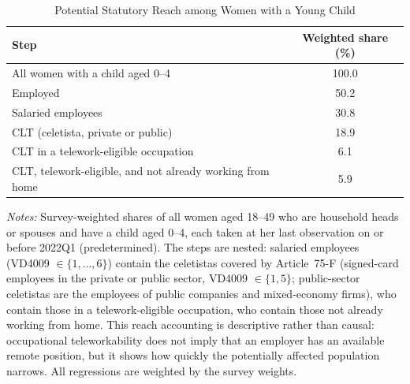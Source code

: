 \begin{table}[H]\centering
\caption{Potential Statutory Reach among Women with a Young Child}
\label{tab:reach}\small
\begin{tabular}{lc}
\toprule
Step & Weighted share (\%) \\
\midrule
All women with a child aged 0--4 & 100.0 \\
Employed & 50.2 \\
Salaried employees & 30.8 \\
CLT (celetista, private or public) & 18.9 \\
CLT in a telework-eligible occupation & 6.1 \\
CLT, telework-eligible, and not already working from home & 5.9 \\
\bottomrule\end{tabular}
\par\vspace{3pt}\footnotesize\raggedright \textit{Notes:} Survey-weighted shares of all women aged 18--49 who are household heads or spouses and have a child aged 0--4, each taken at her last observation on or before 2022Q1 (predetermined). The steps are nested: salaried employees (VD4009 $\in\{1,\dots,6\}$) contain the celetistas covered by Article~75-F (signed-card employees in the private or public sector, VD4009 $\in\{1,5\}$; public-sector celetistas are the employees of public companies and mixed-economy firms), who contain those in a telework-eligible occupation, who contain those not already working from home. This reach accounting is descriptive rather than causal: occupational teleworkability does not imply that an employer has an available remote position, but it shows how quickly the potentially affected population narrows. All regressions are weighted by the survey weights.
\end{table}
